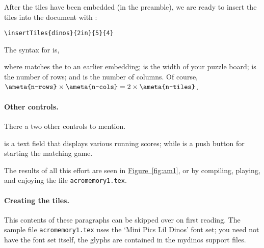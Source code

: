 \documentclass{article}
\begin{document}
After the tiles have been embedded (in the preamble), we are ready to insert
the tiles into the document with :
\begin{Verbatim}[xleftmargin=\parindent]
\insertTiles{dinos}{2in}{5}{4}
\end{Verbatim}
The syntax for  is,
\bVerb{}%
%
\begin{dCmd}[commandchars=!()]{\bxSize}
\end{dCmd}
\eVerb where  matches the  to an earlier embedding;
 is the width of your puzzle board;  is the number
of rows; and  is the number of columns. Of course, $\texttt{\ameta{n-rows}}\times\texttt{\ameta{n-cols}}=2\times\texttt{\ameta{n-tiles}}$.

\paragraph*{Other controls.} There a two other controls to mention.
\bVerb{}%
%
\begin{dCmd}[commandchars=!()]{\bxSize}
\end{dCmd}
\eVerb {} is a text field that displays various running scores; while
 is a push button for starting the matching game.

\newtopic\noindent
The results of all this effort are seen in \hyperref[fig:am1]{Figure~\ref*{fig:am1}},
or by compiling, playing, and enjoying the file \texttt{acromemory1.tex}.


\paragraph*{Creating the tiles.}
This contents of these paragraphs can be skipped over on first reading. The
sample file \texttt{acromemory1.tex} uses the `Mini Pics Lil Dinos' font set;
you need not have the font set itself, the glyphs are contained in the
mydinos support files.
\end{document}
